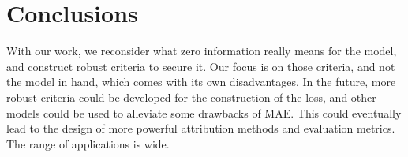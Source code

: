 \section{Conclusions}
\label{sec:conclusion}

With our work, we reconsider what zero information really means for the model, and construct robust criteria to secure it. Our focus is on those criteria, and not the model in hand, which comes with its own disadvantages. In the future, more robust criteria could be developed for the construction of the loss, and other models could be used to alleviate some drawbacks of MAE. This could eventually lead to the design of more powerful attribution methods and evaluation metrics. The range of applications is wide. 
